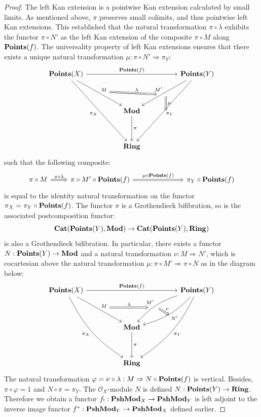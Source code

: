 \documentclass[8pt]{article}
\theoremstyle{definition}
\theoremstyle{definition}
\theoremstyle{definition}
\theoremstyle{definition}
\theoremstyle{definition}
\theoremstyle{definition}
\theoremstyle{definition}
\theoremstyle{definition}
\theoremstyle{definition}
\theoremstyle{definition}
\theoremstyle{definition}
\theoremstyle{definition}
\theoremstyle{definition}
\theoremstyle{definition}
\theoremstyle{question}
\begin{document}
\begin{proof}
The left Kan extension is a pointwise Kan extension calculated by small limits. As mentioned above,
$\pi$ preserves small colimits, and thus pointwise left Kan extensions. This established that the natural
transformation $\pi \circ \lambda$ exhibits the functor $\pi \circ N'$ as the left Kan extension of
the composite $\pi \circ M$ along ${\bf Points}(f)$. The universality property of left Kan extensions ensures
that there exists a unique natural transformation $\mu : \pi \circ N' \Rightarrow \pi_Y$:
\[
\begin{tikzcd}
  {\bf Points}(X) \ar[rrrr, "{\bf Points}(f)"] \ar[ddrr, "M", ""{name=M}] \ar[ddddrr, "\pi_X"'] &&&& {\bf Points}(Y) \ar[ddddll, "\pi_Y", ""{name=piY}] \ar[ddll, "M'"', ""{name=M'}] \\
  \\
  && {\bf Mod} \ar[dd, "\pi"] \\
  \\
  && {\bf Ring}
  \ar[from=M,to=M', Rightarrow, "\lambda", shorten=3.5mm]
  \ar[from=M',to=piY, Rightarrow, "\mu"]
\end{tikzcd}
\]
such that the following composite:
\[
\begin{tikzcd}
  \pi \circ M \ar[r, Rightarrow, "\pi \circ \lambda"] & \pi \circ M' \circ {\bf Points}(f) \ar[rrr, Rightarrow, "\mu \circ {\bf Points}(f)"] &&& \pi_Y \circ {\bf Points}(f)
\end{tikzcd}
\]
is equal to the identity natural transformation on the functor $\pi_X = \pi_Y \circ {\bf Points}(f)$. The functor $\pi$
is a Grothendieck bifibration, so is the associated postcomposition functor:
\[
{\bf Cat}({\bf Points}(Y), {\bf Mod}) \to {\bf Cat}({\bf Points}(Y),{\bf Ring})
\]
is also a Grothendieck bifibration. In particular, there exists a functor $N : {\bf Points}(Y) \to {\bf Mod}$
and a natural transformation $\nu : M \Rightarrow N'$, which is cocartesian above the natural transformation
$\mu : \pi \circ M' \Rightarrow \pi \circ N$ as in the diagram below:
\[
\begin{tikzcd}
  {\bf Points}(X) \ar[rrrr, "{\bf Points}(f)"] \ar[ddrr, "M", ""{name=M}] \ar[ddddrr, "\pi_X"', bend right=15] &&&& {\bf Points}(Y) \ar[ddddll, "\pi_Y", bend left=15, ""{name=piY}] \ar[ddll, "M'"', bend right=15, ""{name=M'}] \ar[ddll, "N'", bend left=15, ""{name=N}]  \\
  \\
  && {\bf Mod} \ar[dd, "\pi"] \\
  \\
  && {\bf Ring}
  \ar[from=M,to=M', Rightarrow, "\lambda", shorten=3.5mm]
  \ar[from=M',to=N, Rightarrow, "\nu"]
\end{tikzcd}
\]
The natural transformation $\varphi = \nu \circ \lambda : M \Rightarrow N \circ {\bf Points}(f)$ is vertical. Besides, $\pi \circ \varphi = 1$
and $N \circ \pi = \pi_Y$. The $\mathcal{O}_X$-module $N$ is defined $N : {\bf Points}(Y) \to {\bf Ring}$.
Therefore we obtain a functor $f_! : {\bf PshMod}_X \to {\bf PshMod}_Y$ is left adjoint to the inverse image functor
$f^* : {\bf PshMod}_Y \to {\bf PshMod}_X$ defined earlier.

\end{proof}
\end{document}
